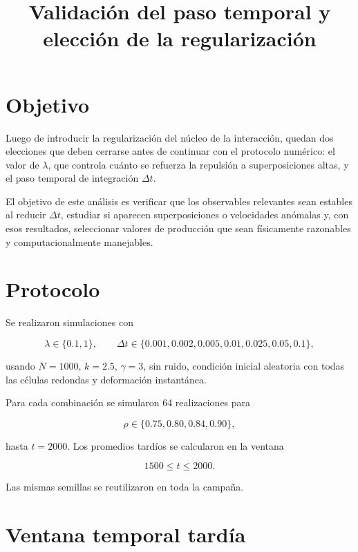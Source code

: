 \documentclass[11pt,a4paper]{article}
\title{Validación del paso temporal y elección de la regularización}
\author{}
\date{}
\begin{document}
\maketitle

\section{Objetivo}

Luego de introducir la regularización del núcleo de la interacción, quedan dos
elecciones que deben cerrarse antes de continuar con el protocolo numérico:
el valor de \(\lambda\), que controla cuánto se refuerza la repulsión a
superposiciones altas, y el paso temporal de integración \(\Delta t\).

El objetivo de este análisis es verificar que los observables relevantes sean
estables al reducir \(\Delta t\), estudiar si aparecen superposiciones o
velocidades anómalas y, con esos resultados, seleccionar valores de producción
que sean físicamente razonables y computacionalmente manejables.

\section{Protocolo}

Se realizaron simulaciones con

\begin{equation}
\lambda\in\{0.1,1\},
\qquad
\Delta t\in
\{0.001,0.002,0.005,0.01,0.025,0.05,0.1\},
\end{equation}

usando \(N=1000\), \(k=2.5\), \(\gamma=3\), sin ruido, condición inicial
aleatoria con todas las células redondas y deformación instantánea.

Para cada combinación se simularon 64 realizaciones para

\begin{equation}
\rho\in\{0.75,0.80,0.84,0.90\},
\end{equation}

hasta \(t=2000\). Los promedios tardíos se calcularon en la ventana

\begin{equation}
1500\leq t\leq2000.
\end{equation}

Las mismas semillas se reutilizaron en toda la campaña.

\section{Ventana temporal tardía}
\end{document}
